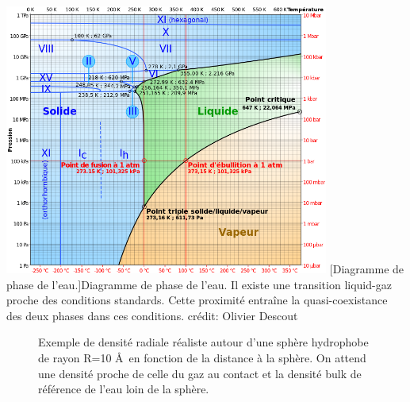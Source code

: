\begin{center}
    \captionsetup{type=figure}
	\includegraphics[width=0.8\textwidth]{chapters/bridge/images/diagramme_phase_eau.png}
	[Diagramme de phase de l'eau.]{Diagramme de phase de l'eau. Il existe une transition liquid-gaz proche des conditions standards. Cette proximité entraîne la quasi-coexistance des deux phases dans ces conditions. crédit: Olivier Descout}
    \label{fig:diagramme_phase_eau}
\end{center}




\begin{figure}[ht]
    \center    
    \caption[Représentation du démouillage autour d'une sphère hydrophobe.]{Exemple de densité radiale réaliste autour d'une sphère hydrophobe de rayon R=10 \AA\ en fonction de la distance à la sphère. On attend une densité proche de celle du gaz au contact et la densité bulk de référence de l'eau loin de la sphère.}
    \label{fig:demouillage}
\end{figure}



